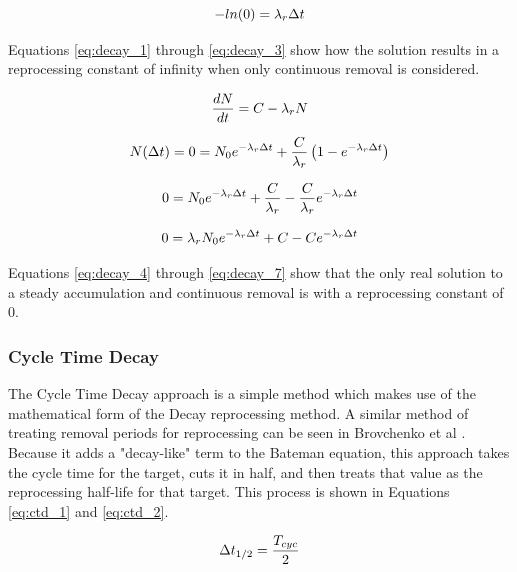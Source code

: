 \begin{equation} \hfill
-ln(0) = \lambda_r \Delta t
\hfill\label{eq:decay_3} \end{equation}

Equations \eqref{eq:decay_1} through \eqref{eq:decay_3} show how the solution results in a reprocessing constant of infinity when only continuous removal is considered.

\begin{equation} \hfill
\frac{dN}{dt} = C -\lambda_r N
\hfill\label{eq:decay_4} \end{equation}

\begin{equation} \hfill
N(\Delta t) = 0 = N_0 e^{-\lambda_r \Delta t} + \frac{C}{\lambda_r} \left( 1 - e^{-\lambda_r \Delta t} \right)
\hfill\label{eq:decay_5} \end{equation}

\begin{equation} \hfill
0 = N_0 e^{-\lambda_r \Delta t} + \frac{C}{\lambda_r} - \frac{C}{\lambda_r} e^{-\lambda_r \Delta t}
\hfill\label{eq:decay_6} \end{equation}

\begin{equation} \hfill
0 = \lambda_r N_0 e^{-\lambda_r \Delta t} + C - C e^{-\lambda_r \Delta t}
\hfill\label{eq:decay_7} \end{equation}


 Equations \eqref{eq:decay_4} through \eqref{eq:decay_7} show that the only real solution to a steady accumulation and continuous removal is with a reprocessing constant of 0. 

\subsubsection{Cycle Time Decay}

The Cycle Time Decay approach is a simple method which makes use of the mathematical form of the Decay reprocessing method. A similar method of treating removal periods for reprocessing can be seen in Brovchenko et al \cite{brovchenko_neutronic_2019}. Because it adds a "decay-like" term to the Bateman equation, this approach takes the cycle time for the target, cuts it in half, and then treats that value as the reprocessing half-life for that target. This process is shown in Equations \eqref{eq:ctd_1} and \eqref{eq:ctd_2}.

\begin{equation} \hfill
\Delta t_{1/2} = \frac{T_{cyc}}{2}
\hfill\label{eq:ctd_1} \end{equation}

